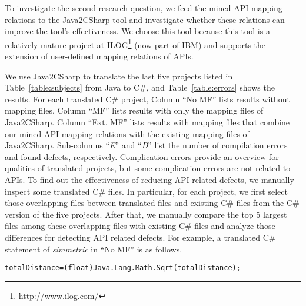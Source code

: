 To investigate the second research question, we feed the
mined API mapping relations to the Java2CSharp tool and
investigate whether these relations can improve the tool's
effectiveness. We choose this tool because this tool is a relatively
mature project at ILOG\footnote{\url{http://www.ilog.com/}} (now
part of IBM) and supports the extension of user-defined mapping
relations of APIs.

We use Java2CSharp to translate the last five projects listed in
Table~\ref{table:subjects} from Java to C\#, and
Table~\ref{table:errors} shows the results. For each translated C\#
project, Column ``No MF'' lists results without mapping files.
Column ``MF'' lists results with only the mapping files of Java2CSharp.
Column ``Ext. MF'' lists results with mapping files that combine
our mined API mapping relations with the existing mapping files of Java2CSharp.
Sub-columns ``\emph{E}'' and ``\emph{D}'' list the number of
compilation errors and found defects, respectively. Complication errors provide an overview for qualities of translated projects, but some complication errors are not related to APIs.
To find out the effectiveness of reducing API related defects, we manually inspect some translated C\# files. In particular, for each project,
we first select those overlapping files between translated files and existing C\# files
from the C\# version of the five projects. After that, we manually compare
the top 5 largest files among these overlapping files with existing C\# files and analyze those differences for detecting API related defects. For example, a translated C\# statement of \emph{simmetric} in ``No MF'' is as follows.

\begin{CodeOut}\vspace*{-1.8ex}
\begin{alltt}
 totalDistance = (float)Java.Lang.Math.Sqrt(totalDistance);
\end{alltt}
\end{CodeOut}\vspace*{-1.8ex}


